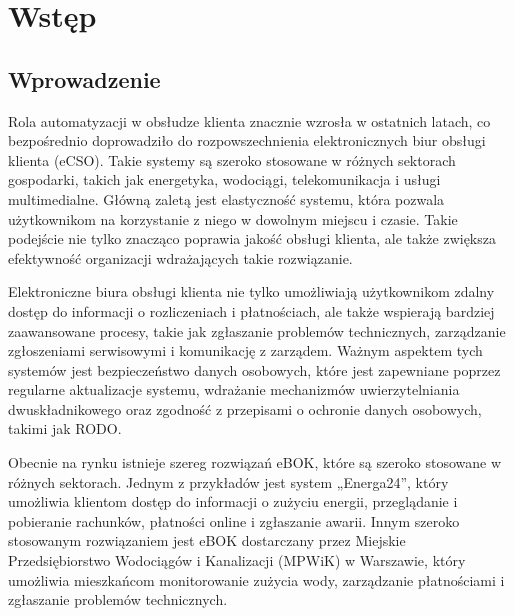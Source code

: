 \chapter{Wstęp}
\section{Wprowadzenie}
Rola automatyzacji w obsłudze klienta znacznie wzrosła w ostatnich latach, co bezpośrednio doprowadziło do rozpowszechnienia elektronicznych biur obsługi klienta (eCSO). 
Takie systemy są szeroko stosowane w różnych sektorach gospodarki, takich jak energetyka, wodociągi, telekomunikacja i usługi multimedialne. Główną zaletą jest elastyczność systemu, która pozwala użytkownikom na korzystanie z niego w dowolnym miejscu i czasie. Takie podejście nie tylko znacząco poprawia jakość obsługi klienta, ale także zwiększa efektywność organizacji wdrażających takie rozwiązanie.

Elektroniczne biura obsługi klienta nie tylko umożliwiają użytkownikom zdalny dostęp do informacji o rozliczeniach i płatnościach, ale także wspierają bardziej zaawansowane procesy, takie jak zgłaszanie problemów technicznych, zarządzanie zgłoszeniami serwisowymi i komunikację z zarządem. Ważnym aspektem tych systemów jest bezpieczeństwo danych osobowych, które jest zapewniane poprzez regularne aktualizacje systemu, wdrażanie mechanizmów uwierzytelniania dwuskładnikowego oraz zgodność z przepisami o ochronie danych osobowych, takimi jak RODO.


Obecnie na rynku istnieje szereg rozwiązań eBOK, które są szeroko stosowane w różnych sektorach. Jednym z przykładów jest system „Energa24”, który umożliwia klientom dostęp do informacji o zużyciu energii, przeglądanie i pobieranie rachunków, płatności online i zgłaszanie awarii. Innym szeroko stosowanym rozwiązaniem jest eBOK dostarczany przez Miejskie Przedsiębiorstwo Wodociągów i Kanalizacji (MPWiK) w Warszawie, który umożliwia mieszkańcom monitorowanie zużycia wody, zarządzanie płatnościami i zgłaszanie problemów technicznych.

